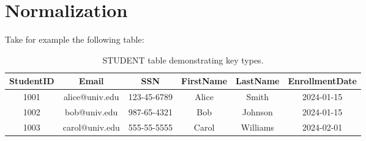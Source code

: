 \section{Normalization}




Take for example the following table:
\begin{table}[h]
\centering
\begin{tabular}{|c|c|c|c|c|c|}
\hline
\textbf{StudentID} & \textbf{Email} & \textbf{SSN} & FirstName & LastName & EnrollmentDate \\
\hline
1001 & \textsf{alice@univ.edu} & 123-45-6789 & Alice & Smith & 2024-01-15 \\
\hline
1002 & \textsf{bob@univ.edu} & 987-65-4321 & Bob & Johnson & 2024-01-15 \\
\hline
1003 & \textsf{carol@univ.edu} & 555-55-5555 & Carol & Williams & 2024-02-01 \\
\hline
\end{tabular}
\caption{STUDENT table demonstrating key types.}
\label{tab:keys}
\end{table}





